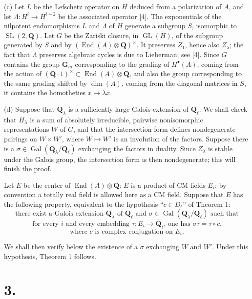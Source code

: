 \documentclass[11pt,a4paper]{article}
\theoremstyle{plain}
\theoremstyle{definition}
\DeclareMathOperator{\Gal}{Gal}
\DeclareMathOperator{\End}{End}
\DeclareMathOperator{\SL}{SL}
\DeclareMathOperator{\GL}{GL}
\begin{document}
(c) Let $L$ be the Lefschetz operator on $H$ deduced from a polarization of $A$, and let $\Lambda : H^i \to H^{i-2}$ be the associated operator [4]. The exponentials of the nilpotent endomorphisms $L$ and $\Lambda$ of $H$ generate a subgroup $S$, isomorphic to $\SL(2, \mathbf{Q})$. Let $G$ be the Zariski closure, in $\GL(H)$, of the subgroup generated by $S$ and by $(\End(A) \otimes \mathbf{Q})^\times$. It preserves $Z_1$, hence also $Z_\lambda$; the fact that $\Lambda$ preserves algebraic cycles is due to Lieberman; see [4]. Since $G$ contains the group $\mathbf{G}_m$ corresponding to the grading of $H^\bullet(A)$, coming from the action of $(\mathbf{Q} \cdot 1)^\times \subset \End(A) \otimes \mathbf{Q}$, and also the group corresponding to the same grading shifted by $\dim(A)$, coming from the diagonal matrices in $S$, it contains the homotheties $x \mapsto \lambda x$.

(d) Suppose that $\mathbf{Q}_\lambda$ is a sufficiently large Galois extension of $\mathbf{Q}_\ell$. We shall check that $H_\lambda$ is a sum of absolutely irreducible, pairwise nonisomorphic representations $W$ of $G$, and that the intersection form defines nondegenerate pairings on $W \times W'$, where $W \mapsto W'$ is an involution of the factors. Suppose there is a $\sigma \in \Gal(\mathbf{Q}_\lambda/\mathbf{Q}_\ell)$ exchanging the factors in duality. Since $Z_\lambda$ is stable under the Galois group, the intersection form is then nondegenerate; this will finish the proof.

Let $E$ be the center of $\End(A) \otimes \mathbf{Q}$: $E$ is a product of CM fields $E_i$; by convention a totally real field is allowed here as a CM field. Suppose that $E$ has the following property, equivalent to the hypothesis ``$c \in D_\ell$'' of Theorem 1:
\begin{equation}\label{eq:hyp}
\text{there exist a Galois extension $\mathbf{Q}_\lambda$ of $\mathbf{Q}_\ell$ and $\sigma \in \Gal(\mathbf{Q}_\lambda/\mathbf{Q}_\ell)$ such that}
\end{equation}
\[
\text{for every $i$ and every embedding $\tau : E_i \to \overline{\mathbf{Q}}_\ell$, one has $\sigma\tau = \tau \circ c$,}
\]
\[
\text{where $c$ is complex conjugation on } E_i .
\]

We shall then verify below the existence of a $\sigma$ exchanging $W$ and $W'$. Under this hypothesis, Theorem 1 follows.

\section*{3.}
\end{document}
